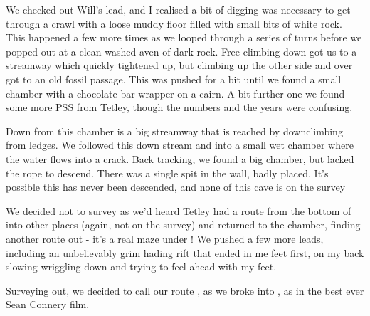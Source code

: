 We checked out Will’s lead, and I realised a bit of digging was necessary to get through a crawl with a loose muddy floor filled with small bits of white rock. This happened a few more times as we looped through a series of turns before we popped out at a clean washed aven of dark rock. Free climbing down got us to a streamway which quickly tightened up, but climbing up the other side and over got to an old fossil passage. This was pushed for a bit until we found a small chamber with a chocolate bar wrapper on a cairn. A bit further one we found some more PSS from Tetley, though the numbers and the years were confusing.

Down from this chamber is a big streamway that is reached by downclimbing from ledges. We followed this down stream and into a small wet chamber where the water flows into a crack. Back tracking, we found a big chamber, but lacked the rope to descend. There was a single spit in the wall, badly placed. It’s possible this has never been descended, and none of this cave is on the survey

We decided not to survey as we’d heard Tetley had a route from the bottom of  into other places (again, not on the survey) and returned to the chamber, finding another route out - it’s a real maze under ! We pushed a few more leads, including an unbelievably grim hading rift that ended in me feet first, on my back slowing wriggling down and trying to feel ahead with my feet.

Surveying out, we decided to call our route , as we broke into , as in the best ever Sean Connery film.

